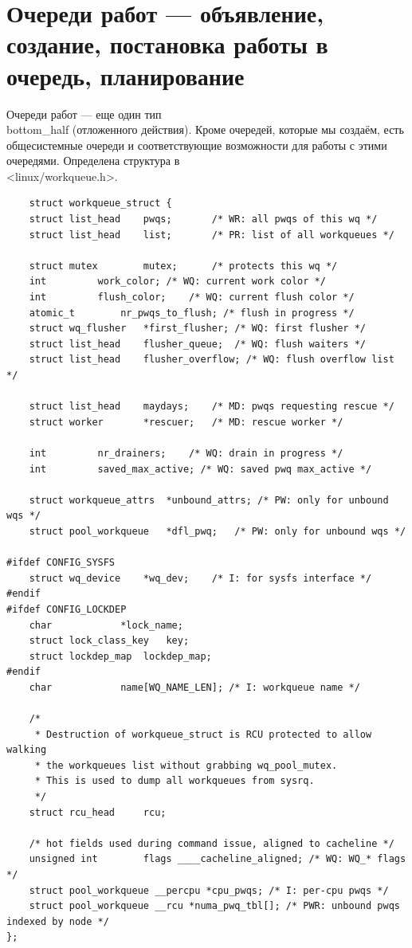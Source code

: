 \section{Очереди работ --- объявление, создание, постановка работы в очередь, планирование}

Очереди работ --- еще один тип \\ bottom\_half (отложенного действия). Кроме очередей, которые мы создаём, есть общесистемные очереди и соответствующие возможности для работы с этими очередями. Определена структура в \\ <linux/workqueue.h>.

\begin{lstlisting}
	struct workqueue_struct {
	struct list_head	pwqs;		/* WR: all pwqs of this wq */
	struct list_head	list;		/* PR: list of all workqueues */

	struct mutex		mutex;		/* protects this wq */
	int			work_color;	/* WQ: current work color */
	int			flush_color;	/* WQ: current flush color */
	atomic_t		nr_pwqs_to_flush; /* flush in progress */
	struct wq_flusher	*first_flusher;	/* WQ: first flusher */
	struct list_head	flusher_queue;	/* WQ: flush waiters */
	struct list_head	flusher_overflow; /* WQ: flush overflow list */

	struct list_head	maydays;	/* MD: pwqs requesting rescue */
	struct worker		*rescuer;	/* MD: rescue worker */

	int			nr_drainers;	/* WQ: drain in progress */
	int			saved_max_active; /* WQ: saved pwq max_active */

	struct workqueue_attrs	*unbound_attrs;	/* PW: only for unbound wqs */
	struct pool_workqueue	*dfl_pwq;	/* PW: only for unbound wqs */

#ifdef CONFIG_SYSFS
	struct wq_device	*wq_dev;	/* I: for sysfs interface */
#endif
#ifdef CONFIG_LOCKDEP
	char			*lock_name;
	struct lock_class_key	key;
	struct lockdep_map	lockdep_map;
#endif
	char			name[WQ_NAME_LEN]; /* I: workqueue name */

	/*
	 * Destruction of workqueue_struct is RCU protected to allow walking
	 * the workqueues list without grabbing wq_pool_mutex.
	 * This is used to dump all workqueues from sysrq.
	 */
	struct rcu_head		rcu;

	/* hot fields used during command issue, aligned to cacheline */
	unsigned int		flags ____cacheline_aligned; /* WQ: WQ_* flags */
	struct pool_workqueue __percpu *cpu_pwqs; /* I: per-cpu pwqs */
	struct pool_workqueue __rcu *numa_pwq_tbl[]; /* PWR: unbound pwqs indexed by node */
};
\end{lstlisting}

